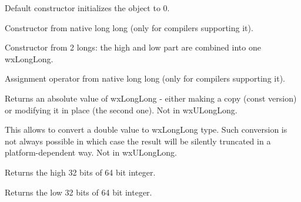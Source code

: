 \label{wxlonglongwxlonglongdef}


Default constructor initializes the object to 0.

\label{wxlonglongwxlonglongll}


Constructor from native long long (only for compilers supporting it).

\label{wxlonglongwxlonglong}


Constructor from 2 longs: the high and low part are combined into one
wxLongLong.

\label{wxlonglongoperatorassign}


Assignment operator from native long long (only for compilers supporting it).

\label{wxlonglongabs}



Returns an absolute value of wxLongLong - either making a copy (const version)
or modifying it in place (the second one).  Not in wxULongLong.

\label{wxlonglongassign}


This allows to convert a double value to wxLongLong type. Such conversion is
not always possible in which case the result will be silently truncated in a
platform-dependent way.  Not in wxULongLong.

\label{wxlonglonggethi}


Returns the high 32 bits of 64 bit integer.

\label{wxlonglonggetlo}


Returns the low 32 bits of 64 bit integer.

